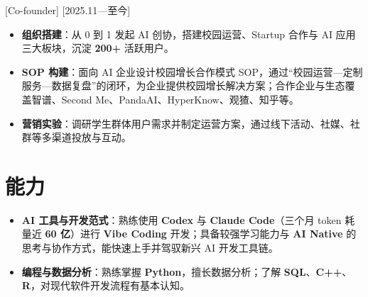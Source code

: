\documentclass{resume}
\begin{document}
[Co-founder]
[2025.11—至今]
\begin{itemize}
  \item \textbf{组织搭建}：从 0 到 1 发起 AI 创协，搭建校园运营、Startup 合作与 AI 应用三大板块，沉淀 \textbf{200+} 活跃用户。
  \item \textbf{SOP 构建}：面向 AI 企业设计校园增长合作模式 SOP，通过“校园运营—定制服务—数据复盘”的闭环，为企业提供校园增长解决方案；合作企业与生态覆盖智谱、Second Me、PandaAI、HyperKnow、观猹、知乎等。
  \item \textbf{营销实验}：调研学生群体用户需求并制定运营方案，通过线下活动、社媒、社群等多渠道投放与互动。
\end{itemize}

\section{能力}
\begin{itemize}
  \item \textbf{AI 工具与开发范式}：熟练使用 \textbf{Codex} 与 \textbf{Claude Code}（三个月 token 耗量近 \textbf{60 亿}）进行 \textbf{Vibe Coding} 开发；具备较强学习能力与 \textbf{AI Native} 的思考与协作方式，能快速上手并驾驭新兴 AI 开发工具链。
  \item \textbf{编程与数据分析}：熟练掌握 \textbf{Python}，擅长数据分析；了解 \textbf{SQL}、\textbf{C++}、\textbf{R}，对现代软件开发流程有基本认知。
\end{itemize}
\end{document}
